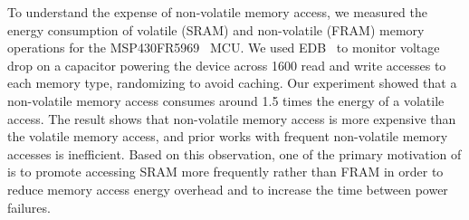 To understand the expense of non-volatile memory access, we measured the energy consumption of volatile (SRAM) and non-volatile (FRAM) memory 
operations for the MSP430FR5969~\cite{msp430datasheet} MCU. We used EDB~\cite{edb} to monitor voltage drop on a capacitor powering the device 
across 1600 read and write accesses to each memory type, randomizing to avoid caching. Our experiment showed that a non-volatile memory access 
consumes around 1.5 times the energy of a volatile access. The result shows that non-volatile memory access is more expensive than the volatile
memory access, and prior works with frequent non-volatile memory accesses is inefficient.
Based on this observation, one of the primary motivation of \sys is to promote accessing SRAM more frequently rather than FRAM in order to 
reduce memory access energy overhead and to increase the time between power failures. 

